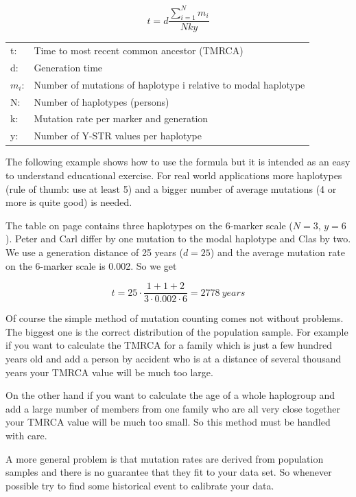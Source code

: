 \begin{equation}
t = d \frac{\sum_{i=1}^{N} m_i}{N k y}
\end{equation}

\begin{tabular}{ll}
t: & Time to most recent common ancestor (TMRCA)\\
d: & Generation time\\
$m_i$: &  Number of mutations of haplotype i relative to modal haplotype\\
N: &  Number of haplotypes (persons) \\
k: &  Mutation rate per marker and generation\\
y: &  Number of Y-STR values per haplotype
\end{tabular}
\vspace{1em}

The following example shows how to use the formula but it
is intended as an easy to understand educational exercise.
For real world applications more haplotypes (rule of thumb:
use at least 5) and a bigger number of average mutations
(4 or more is quite good) is needed. 

The table on page \pageref{tblmodalhaplotype} contains three
haplotypes on the 6-marker scale ($N=3$, $y=6$). Peter and
Carl differ by one mutation to the modal haplotype and Clas
by two. We use a generation distance of 25 years ($d=25$)
and the average mutation rate on the 6-marker scale is
0.002\cite{Kly09}. So we get

\begin{equation}
t = 25 \cdot \frac{1 + 1 + 2}{3 \cdot 0.002 \cdot 6} = 2778\ years
\end{equation}

Of course the simple method of mutation counting comes not without
problems. The biggest one is the correct distribution of the
population sample. For example if you want to calculate the
TMRCA for a family which is just a few hundred years old
and add a person by accident who is at a distance of several
thousand years your TMRCA value will be much too large.

On the other hand if you want to calculate the age of a whole
haplogroup and add a large number of members from one family
who are all very close together your TMRCA value will be much
too small. So this method must be handled with care.

A more general problem is that mutation rates are derived
from population samples and there is no guarantee that they
fit to your data set. So whenever possible try to find some
historical event to calibrate your data.



